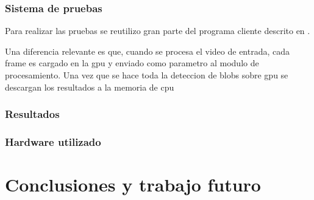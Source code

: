 \documentclass[a4paper,10pt]{report}
\begin{document}
 
 
 
 
 
 
 
 
 
 
 
 
\subsection{Sistema de pruebas}
Para realizar las pruebas se reutilizo gran parte del programa cliente descrito en \cite[capitulo 4]{Jaureguiberry}.

Una diferencia relevante es que, cuando se procesa el video de entrada, cada frame es cargado en la gpu y enviado como parametro al modulo de procesamiento. 
Una vez que se hace toda la deteccion de blobs sobre gpu se descargan los resultados a la memoria de cpu

\subsection{Resultados}





\subsection{Hardware utilizado}

\chapter{Conclusiones y trabajo futuro}

\end{document}
